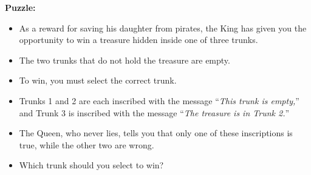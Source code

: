 \begin{tcolorbox}[title=Example 1: King's Daughter Treasure Logic Puzzle (1/2)]
\textbf{Puzzle:}  
\begin{itemize}
    \item As a reward for saving his daughter from pirates, the King has given you the opportunity to win
a treasure hidden inside one of three trunks. 
    \item The two trunks that do not hold the treasure are
empty. 
    \item To win, you must select the correct trunk. \item Trunks 1 and 2 are each inscribed with the
message “\textit{This trunk is empty,}” and Trunk 3 is inscribed with the message “\textit{The treasure is in
Trunk 2.}” 
    \item The Queen, who never lies, tells you that only one of these inscriptions is true, while
the other two are wrong. 
    \item Which trunk should you select to win?
\end{itemize}{}


\end{tcolorbox}
